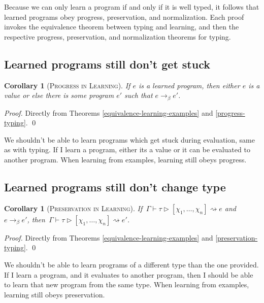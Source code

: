 \documentclass[acmsmall]{acmart}
\renewenvironment{proof}
    {\textit{Proof.}}
    {\qed\\}
\theoremstyle{mytheoremstyle}
\newtheorem{corollary}[theorem]{Corollary}
\begin{document}
Because we can only learn a program if and only if it is well typed, it follows that learned programs obey progress, preservation, and normalization. Each proof invokes the equivalence theorem between typing and learning, and then the respective progress, preservation, and normalization theorems for typing.

\subsection{Learned programs still don't get stuck}

\begin{corollary}[\textsc{Progress in Learning}]
If $e$ is a learned program, then either $e$ is a value or else there is some program $e'$ such that $e \to_\beta e'$.
\label{progress-learning}
\end{corollary}
\begin{proof}
Directly from Theorems \ref{equivalence-learning-examples} and \ref{progress-typing}.
\end{proof}
\vspace{-.8em}

We shouldn't be able to learn programs which get stuck during evaluation, same as with typing. If I learn a program, either its a value or it can be evaluated to another program. When learning from examples, learning still obeys progress.

\subsection{Learned programs still don't change type}

\begin{corollary}[\textsc{Preservation in Learning}]
If $\,\Gamma \vdash \tau \rhd [\chi_1,\dots,\chi_n] \rightsquigarrow e$ and $e \to_\beta e'$, then $\,\Gamma \vdash \tau \rhd [\chi_1,\dots,\chi_n] \rightsquigarrow e'$.
\label{preservation-learning}
\end{corollary}
\begin{proof}
Directly from Theorems \ref{equivalence-learning-examples} and \ref{preservation-typing}. 
\end{proof}
\vspace{-.8em}

We shouldn't be able to learn programs of a different type than the one provided. If I learn a program, and it evaluates to another program, then I should be able to learn that new program from the same type. When learning from examples, learning still obeys preservation.
\end{document}
